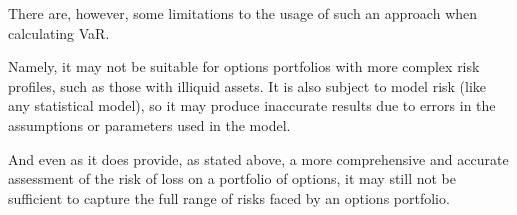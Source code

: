 \documentclass[a4paper, 12pt]{article}
\theoremstyle{definition}
\theoremstyle{plain}
\begin{document}
There are, however, some limitations to the usage of such an approach
when calculating VaR. 

Namely, it may not be suitable for options portfolios with more complex 
risk profiles, such as those with illiquid assets. 
It is also subject to model risk (like any statistical model),
so it may produce inaccurate results due to errors in the 
assumptions or parameters used in the model.

And even as it does provide, as stated above, 
a more comprehensive and accurate assessment of the risk 
of loss on a portfolio of options, it may still not be 
sufficient to capture the full range of risks faced by 
an options portfolio.
\end{document}
